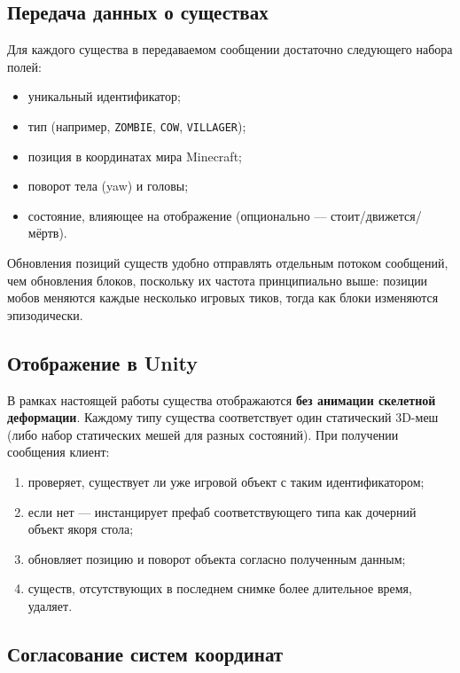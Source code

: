 \documentclass[a4paper,12pt]{article}
\begin{document}
\subsection*{Передача данных о существах}

Для каждого существа в передаваемом сообщении достаточно следующего набора полей:

\begin{itemize}
    \item уникальный идентификатор;
    \item тип (например, \texttt{ZOMBIE}, \texttt{COW}, \texttt{VILLAGER});
    \item позиция в координатах мира Minecraft;
    \item поворот тела (yaw) и головы;
    \item состояние, влияющее на отображение (опционально --- стоит/движется/мёртв).
\end{itemize}

Обновления позиций существ удобно отправлять отдельным потоком сообщений, чем обновления блоков, поскольку их частота принципиально выше: позиции мобов меняются каждые несколько игровых тиков, тогда как блоки изменяются эпизодически.

\subsection*{Отображение в Unity}

В рамках настоящей работы существа отображаются \textbf{без анимации скелетной деформации}. Каждому типу существа соответствует один статический 3D-меш (либо набор статических мешей для разных состояний). При получении сообщения клиент:

\begin{enumerate}
    \item проверяет, существует ли уже игровой объект с таким идентификатором;
    \item если нет --- инстанцирует префаб соответствующего типа как дочерний объект якоря стола;
    \item обновляет позицию и поворот объекта согласно полученным данным;
    \item существ, отсутствующих в последнем снимке более длительное время, удаляет.
\end{enumerate}

\subsection*{Согласование систем координат}
\end{document}
